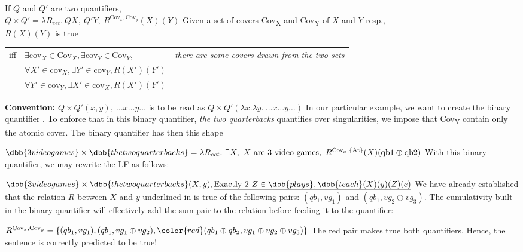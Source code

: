 \documentclass[english]{article}
\begin{document}
\pex
\a 
If $Q$ and $Q'$ are two quantifiers,\\
$Q\times Q' = \lambda R_{eet}.\  Q X,\ Q' Y,\
R^{\text{Cov}_x,\text{Cov}_y}(X)(Y)
$
\a Given a set of covers Cov\textsubscript{X} and Cov\textsubscript{Y} of $X$ and $Y$ resp., \\
$R(X)(Y)$ is true \\
\setlength{\tabcolsep}{3pt}
\begin{tabular}{lll}%
iff& $\exists \text{cov}_X\in \text{Cov}_{X}, \exists \text{cov}_Y\in \text{Cov}_{Y},$& \emph{there are some covers drawn from the two sets}\\
&$\forall X'\in \text{cov}_{X}, \exists Y'\in \text{cov}_{Y}, R(X')(Y')$&\\
&$\forall Y'\in \text{cov}_{Y}, \exists X'\in \text{cov}_{X}, R(X')(Y')$&\\

\end{tabular}
\a \textbf{Convention:} $Q\times Q' (x,y),\ \ldots x \ldots y \ldots$ is to be read as $Q\times Q'\left( \lambda x. \lambda y.\ \ldots x \ldots y \ldots\right) $ 
\xe
%
In our particular example, we want to create the binary quantifier . To enforce that in this binary quantifier, \emph{the two quarterbacks} quantifies over singularities, we impose that Cov\textsubscript{Y} contain only the atomic cover. The binary quantifier has then this shape

\ex
$\dbb{3 video games}\times \dbb{the two quarterbacks} = \lambda R_{eet}.\  \exists X,\ X\text{ are 3 video-games},\
R^{\text{Cov}_x,\left\lbrace \text{At}\right\rbrace}(X)(\text{qb1}\oplus\text{qb2})
$
\xe
%
With this binary quantifier, we may rewrite the LF as follows:

\ex
$\dbb{3 video games}\times \dbb{the two quarterbacks} (X, y), \underline{\text{Exactly 2 } Z\in \dbb{plays},  \dbb{teach}(X)(y)(Z)(e)}$
\xe
%
We have already established that the relation $R$ between $X$ and $y$ underlined in \clastx  is true of the following pairs: $(qb_1, vg_1)$ and $(qb_1, vg_2\oplus vg_3)$. The cumulativity built in the binary quantifier will effectively add the sum pair to the relation before feeding it to the quantifier:

\ex
$R^{\text{Cov}_x,\text{Cov}_y} = \left\lbrace (qb_1, vg_1),(qb_1, vg_1\oplus vg_2), {\color{red}(qb_1 \oplus qb_2, vg_1\oplus vg_2\oplus vg_3)}\right\rbrace$
\xe
%
The red pair makes true both quantifiers. Hence, the sentence is correctly predicted to be true!
\end{document}
